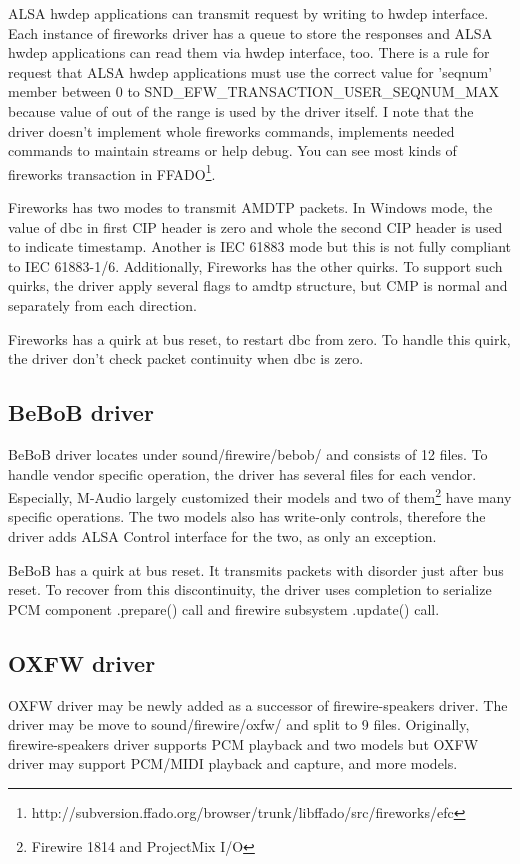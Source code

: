 \documentclass[onecolumn]{article}
\begin{document}
ALSA hwdep applications can transmit request by writing to hwdep interface. Each instance of fireworks driver has a queue to store the responses and ALSA hwdep applications can read them via hwdep interface, too. There is a rule for request that ALSA hwdep applications must use the correct value for 'seqnum' member between 0 to SND\_EFW\_TRANSACTION\_USER\_SEQNUM\_MAX because value of out of the range is used by the driver itself. I note that the driver doesn't implement whole fireworks commands, implements needed commands to maintain streams or help debug. You can see most kinds of fireworks transaction in FFADO\footnote{http://subversion.ffado.org/browser/trunk/libffado/src/fireworks/efc}.

Fireworks has two modes to transmit AMDTP packets. In Windows mode, the value of dbc in first CIP header is zero and whole the second CIP header is used to indicate timestamp. Another is IEC 61883 mode but this is not fully compliant to IEC 61883-1/6. Additionally, Fireworks has the other quirks. To support such quirks, the driver apply several flags to amdtp structure, but CMP is normal and separately from each direction.

Fireworks has a quirk at bus reset, to restart dbc from zero. To handle this quirk, the driver don't check packet continuity when dbc is zero.

\subsection{BeBoB driver}

BeBoB driver locates under sound/firewire/bebob/ and consists of 12 files. To handle vendor specific operation, the driver has several files for each vendor. Especially, M-Audio largely customized their models and two of them\footnote{Firewire 1814 and ProjectMix I/O} have many specific operations. The two models also has write-only controls, therefore the driver adds ALSA Control interface for the two, as only an exception.

BeBoB has a quirk at bus reset. It transmits packets with disorder just after bus reset. To recover from this discontinuity, the driver uses completion to serialize PCM component .prepare() call and firewire subsystem .update() call.

\subsection{OXFW driver}

OXFW driver may be newly added as a successor of firewire-speakers driver. The driver may be move to sound/firewire/oxfw/ and split to 9 files. Originally, firewire-speakers driver supports PCM playback and two models but OXFW driver may support PCM/MIDI playback and capture, and more models.
\end{document}
